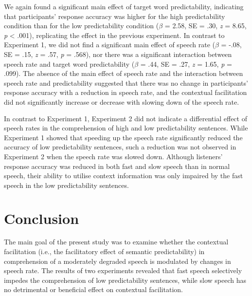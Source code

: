 \documentclass[a4paper, nobind]{templates/ociamthesis}
\begin{document}
We again found a significant main effect of target word predictability, indicating that participants' response accuracy was higher for the high predictability condition than for the low predictability condition (\(\beta\) = 2.58, SE = .30, \emph{z} = 8.65, \emph{p} \textless{} .001),
replicating the effect in the previous experiment.
In contrast to Experiment 1, we did not find a significant main effect of speech rate (\(\beta\) = -.08, SE = .15, \emph{z} = .57, \emph{p} = .568),
nor there was a significant interaction between speech rate and target word predictability (\(\beta\) = .44, SE = .27, \emph{z} = 1.65, \emph{p} = .099).
The absence of the main effect of speech rate and the interaction between speech rate and predictability suggested that there was no change in participants' response accuracy with a reduction in speech rate,
and the contextual facilitation did not significantly increase or decrease with slowing down of the speech rate.

In contrast to Experiment 1, Experiment 2 did not indicate a differential effect of speech rates in the comprehension of high and low predictability sentences.
While Experiment 1 showed that speeding up the speech rate significantly reduced the accuracy of low predictability sentences, such a reduction was not observed in Experiment 2 when the speech rate was slowed down.
Although listeners' response accuracy was reduced in both fast and slow speech than in normal speech, their ability to utilise context information was only impaired by the fast speech in the low predictability sentences.

\hypertarget{conclusion-2}{%
\section{Conclusion}\label{conclusion-2}}

The main goal of the present study was to examine whether the contextual facilitation (i.e., the facilitatory effect of semantic predictability) in comprehension of a moderately degraded speech is modulated by changes in speech rate.
The results of two experiments revealed that fast speech selectively impedes the comprehension of low predictability sentences, while slow speech has no detrimental or beneficial effect on contextual facilitation.
\end{document}
